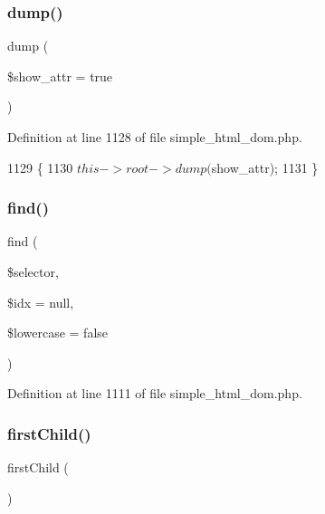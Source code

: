 \subsubsection{\texorpdfstring{dump()}{dump()}}
{\footnotesize\ttfamily dump (\begin{DoxyParamCaption}\item[{}]{\$show\+\_\+attr = {\ttfamily true} }\end{DoxyParamCaption})}



Definition at line 1128 of file simple\+\_\+html\+\_\+dom.\+php.


\begin{DoxyCode}
1129     \{
1130         $this->root->dump($show\_attr);
1131     \}
\end{DoxyCode}
\hypertarget{classsimple__html__dom_afbf375e355aa32c25f7e389a04ddced0}{}\label{classsimple__html__dom_afbf375e355aa32c25f7e389a04ddced0} 
\subsubsection{\texorpdfstring{find()}{find()}}
{\footnotesize\ttfamily find (\begin{DoxyParamCaption}\item[{}]{\$selector,  }\item[{}]{\$idx = {\ttfamily null},  }\item[{}]{\$lowercase = {\ttfamily false} }\end{DoxyParamCaption})}



Definition at line 1111 of file simple\+\_\+html\+\_\+dom.\+php.


\hypertarget{classsimple__html__dom_a2e7ff3e4db465652634f86004ccb83db}{}\label{classsimple__html__dom_a2e7ff3e4db465652634f86004ccb83db} 
\subsubsection{\texorpdfstring{first\+Child()}{firstChild()}}
{\footnotesize\ttfamily first\+Child (\begin{DoxyParamCaption}{ }\end{DoxyParamCaption})}



